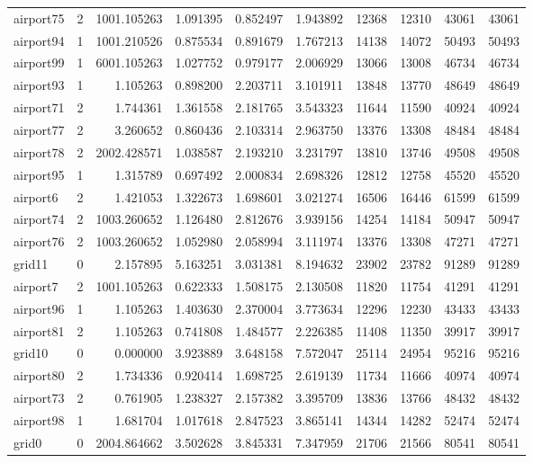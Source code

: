\begin{longtable}{|l|r|r|r|r|r|r|r|r|r|}
airport75 & 2 & 1001.105263 & 1.091395 & 0.852497 & 1.943892 & 12368 & 12310 & 43061 & 43061 \\
airport94 & 1 & 1001.210526 & 0.875534 & 0.891679 & 1.767213 & 14138 & 14072 & 50493 & 50493 \\
airport99 & 1 & 6001.105263 & 1.027752 & 0.979177 & 2.006929 & 13066 & 13008 & 46734 & 46734 \\
airport93 & 1 & 1.105263 & 0.898200 & 2.203711 & 3.101911 & 13848 & 13770 & 48649 & 48649 \\
airport71 & 2 & 1.744361 & 1.361558 & 2.181765 & 3.543323 & 11644 & 11590 & 40924 & 40924 \\
airport77 & 2 & 3.260652 & 0.860436 & 2.103314 & 2.963750 & 13376 & 13308 & 48484 & 48484 \\
airport78 & 2 & 2002.428571 & 1.038587 & 2.193210 & 3.231797 & 13810 & 13746 & 49508 & 49508 \\
airport95 & 1 & 1.315789 & 0.697492 & 2.000834 & 2.698326 & 12812 & 12758 & 45520 & 45520 \\
airport6 & 2 & 1.421053 & 1.322673 & 1.698601 & 3.021274 & 16506 & 16446 & 61599 & 61599 \\
airport74 & 2 & 1003.260652 & 1.126480 & 2.812676 & 3.939156 & 14254 & 14184 & 50947 & 50947 \\
airport76 & 2 & 1003.260652 & 1.052980 & 2.058994 & 3.111974 & 13376 & 13308 & 47271 & 47271 \\
grid11 & 0 & 2.157895 & 5.163251 & 3.031381 & 8.194632 & 23902 & 23782 & 91289 & 91289 \\
airport7 & 2 & 1001.105263 & 0.622333 & 1.508175 & 2.130508 & 11820 & 11754 & 41291 & 41291 \\
airport96 & 1 & 1.105263 & 1.403630 & 2.370004 & 3.773634 & 12296 & 12230 & 43433 & 43433 \\
airport81 & 2 & 1.105263 & 0.741808 & 1.484577 & 2.226385 & 11408 & 11350 & 39917 & 39917 \\
grid10 & 0 & 0.000000 & 3.923889 & 3.648158 & 7.572047 & 25114 & 24954 & 95216 & 95216 \\
airport80 & 2 & 1.734336 & 0.920414 & 1.698725 & 2.619139 & 11734 & 11666 & 40974 & 40974 \\
airport73 & 2 & 0.761905 & 1.238327 & 2.157382 & 3.395709 & 13836 & 13766 & 48432 & 48432 \\
airport98 & 1 & 1.681704 & 1.017618 & 2.847523 & 3.865141 & 14344 & 14282 & 52474 & 52474 \\
grid0 & 0 & 2004.864662 & 3.502628 & 3.845331 & 7.347959 & 21706 & 21566 & 80541 & 80541 \\

\end{longtable}

